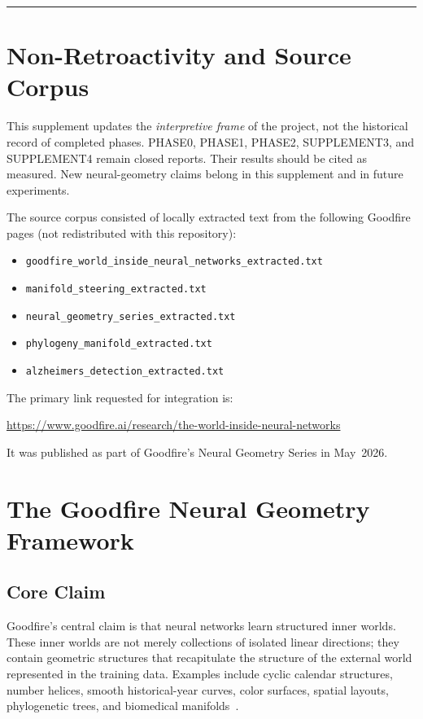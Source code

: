 \documentclass[11pt,a4paper]{article}
\begin{document}
\vspace{0.5em}\hrule\vspace{0.5em}
\tableofcontents
\newpage

\section{Non-Retroactivity and Source Corpus}
\label{sec:nonretro}

\begin{warningbox}
This supplement updates the \emph{interpretive frame} of the project, not the historical record of completed phases. PHASE0, PHASE1, PHASE2, SUPPLEMENT3, and SUPPLEMENT4 remain closed reports. Their results should be cited as measured. New neural-geometry claims belong in this supplement and in future experiments.
\end{warningbox}

The source corpus consisted of locally extracted text from the following Goodfire pages (not redistributed with this repository):
\begin{itemize}[noitemsep]
  \item \texttt{goodfire\_world\_inside\_neural\_networks\_extracted.txt}
  \item \texttt{manifold\_steering\_extracted.txt}
  \item \texttt{neural\_geometry\_series\_extracted.txt}
  \item \texttt{phylogeny\_manifold\_extracted.txt}
  \item \texttt{alzheimers\_detection\_extracted.txt}
\end{itemize}

The primary link requested for integration is:
\begin{center}
\url{https://www.goodfire.ai/research/the-world-inside-neural-networks}
\end{center}
It was published as part of Goodfire's Neural Geometry Series in May~2026.

\section{The Goodfire Neural Geometry Framework}
\label{sec:goodfire}

\subsection{Core Claim}

Goodfire's central claim is that neural networks learn structured inner worlds. These inner worlds are not merely collections of isolated linear directions; they contain geometric structures that recapitulate the structure of the external world represented in the training data. Examples include cyclic calendar structures, number helices, smooth historical-year curves, color surfaces, spatial layouts, phylogenetic trees, and biomedical manifolds~\citep{geiger2026worldinside,pearce2025treeoflife,wang2026alzheimers}.
\end{document}
